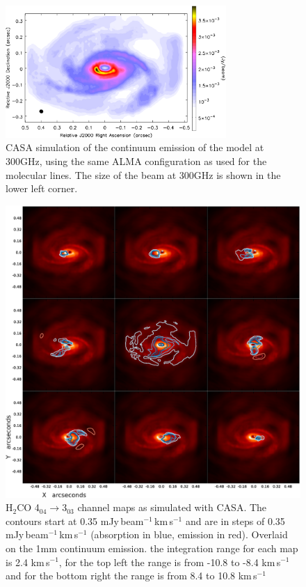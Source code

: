 \documentclass[useAMS,usenatbib]{mn2e}
\begin{document}
\begin{figure}
 \includegraphics[width=84mm]{Figures/sim/fig10.eps}

 \caption{CASA simulation of the continuum emission of the model at 300GHz, using the same ALMA configuration as used for the molecular lines. The size of the beam at 300GHz is shown in the lower left corner.}
 \label{continuum}
\end{figure}

\begin{figure}
 \includegraphics[width=168mm]{Figures/sim/fig11.eps} 
 \caption{H$_2$CO 4$_{04}\rightarrow$3$_{03}$ channel maps as simulated with CASA. The contours start at 0.35 mJy$\,$beam$^{-1}\,$km$\,$s$^{-1}$  and are in steps of 0.35 mJy$\,$beam$^{-1}\,$km$\,$s$^{-1}$ (absorption in blue, emission in red). Overlaid on the 1mm continuum emission. the integration range for each map is 2.4 km$\,$s$^{-1}$, for the top left the range is from -10.8 to -8.4 km$\,$s$^{-1}$ and for the bottom right the range is from 8.4 to 10.8 km$\,$s$^{-1}$}
 \label{h2co_chanmap}
\end{figure}
\end{document}
